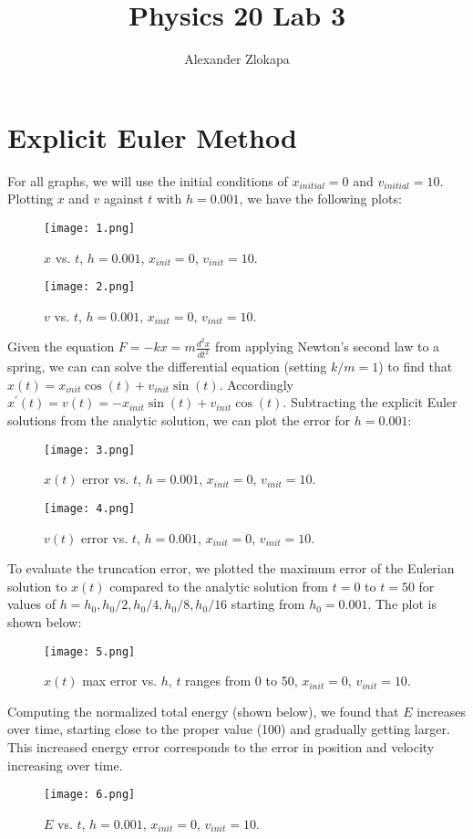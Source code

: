 \documentclass[a4paper]{article}
\title{Physics 20 Lab 3}
\author{Alexander Zlokapa}
\begin{document}
\maketitle

\section{Explicit Euler Method}
For all graphs, we will use the initial conditions of $x_{initial} = 0$ and $v_{initial} = 10$. Plotting $x$ and $v$ against $t$ with $h = 0.001$, we have the following plots:
\begin{figure}[H]
\centering
\texttt{[image: 1.png]}
\caption{$x$ vs. $t$, $h = 0.001$, $x_{init} = 0$, $v_{init} = 10$.}
\end{figure}
\begin{figure}[H]
\centering
\texttt{[image: 2.png]}
\caption{$v$ vs. $t$, $h = 0.001$, $x_{init} = 0$, $v_{init} = 10$.}
\end{figure}
Given the equation $F = -kx = m\frac{d^2x}{dt^2}$ from applying Newton's second law to a spring, we can can solve the differential equation (setting $k/m=1$) to find that $x(t) = x_{init} \cos(t) + v_{init} \sin(t)$. Accordingly $x^\prime (t) = v(t) = -x_{init} \sin(t) + v_{init} \cos(t)$. Subtracting the explicit Euler solutions from the analytic solution, we can plot the error for $h=0.001$:
\begin{figure}[H]
\centering
\texttt{[image: 3.png]}
\caption{$x(t)$ error vs. $t$, $h = 0.001$, $x_{init} = 0$, $v_{init} = 10$.}
\end{figure}
\begin{figure}[H]
\centering
\texttt{[image: 4.png]}
\caption{$v(t)$ error vs. $t$, $h = 0.001$, $x_{init} = 0$, $v_{init} = 10$.}
\end{figure}
To evaluate the truncation error, we plotted the maximum error of the Eulerian solution to $x(t)$ compared to the analytic solution from $t = 0$ to $t = 50$ for values of $h = h_0, h_0/2, h_0/4, h_0/8, h_0/16$ starting from $h_0 = 0.001$. The plot is shown below:
\begin{figure}[H]
\centering
\texttt{[image: 5.png]}
\caption{$x(t)$ max error vs. $h$, $t$ ranges from 0 to 50, $x_{init} = 0$, $v_{init} = 10$.}
\end{figure}
Computing the normalized total energy (shown below), we found that $E$ increases over time, starting close to the proper value (100) and gradually getting larger. This increased energy error corresponds to the error in position and velocity increasing over time.
\begin{figure}[H]
\centering
\texttt{[image: 6.png]}
\caption{$E$ vs. $t$, $h = 0.001$, $x_{init} = 0$, $v_{init} = 10$.}
\end{figure}
\end{document}
